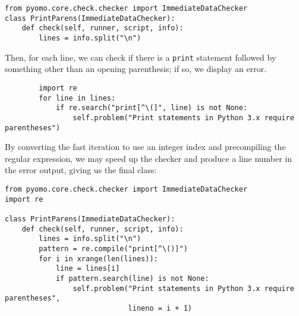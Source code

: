 \documentclass{article}
\begin{document}
\begin{verbatim}
from pyomo.core.check.checker import ImmediateDataChecker
class PrintParens(ImmediateDataChecker):
    def check(self, runner, script, info):
        lines = info.split("\n")
\end{verbatim}

Then, for each line, we can check if there is a \verb!print! statement followed by something other than an opening parenthesis; if so, we display an error.

\begin{verbatim}
        import re
        for line in lines:
            if re.search("print[^\(]", line) is not None:
                self.problem("Print statements in Python 3.x require parentheses")
\end{verbatim}

By converting the fast iteration to use an integer index and precompiling the regular expression, we may speed up the checker and produce a line number in the error output, giving us the final class:

\begin{verbatim}
from pyomo.core.check.checker import ImmediateDataChecker
import re

class PrintParens(ImmediateDataChecker):
    def check(self, runner, script, info):
        lines = info.split("\n")
        pattern = re.compile("print[^\()]")
        for i in xrange(len(lines)):
            line = lines[i]
            if pattern.search(line) is not None:
                self.problem("Print statements in Python 3.x require parentheses", 
                             lineno = i + 1)
\end{verbatim}
\end{document}
